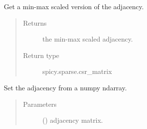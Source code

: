 \documentclass[letterpaper,10pt,english]{sphinxmanual}
\begin{document}
\begin{fulllineitems}
\begin{fulllineitems}
\label{\detokenize{_modules/cosifer.collections:cosifer.collections.graph.Graph.get_scaled_adjacency}}
Get a min-max scaled version of the adjacency.
\begin{quote}\begin{description}
\item[{Returns}] \leavevmode
the min-max scaled adjacency.

\item[{Return type}] \leavevmode
spicy.sparse.csr\_matrix

\end{description}\end{quote}

\end{fulllineitems}


\begin{fulllineitems}
\end{fulllineitems}


\begin{fulllineitems}
\end{fulllineitems}


\begin{fulllineitems}
\end{fulllineitems}


\begin{fulllineitems}
\label{\detokenize{_modules/cosifer.collections:cosifer.collections.graph.Graph.set_adjacency_from_numpy}}
Set the adjacency from a numpy ndarray.
\begin{quote}\begin{description}
\item[{Parameters}] \leavevmode
{} () \textendash{} adjacency matrix.


\end{description}
\end{quote}
\end{fulllineitems}
\end{fulllineitems}
\end{document}
